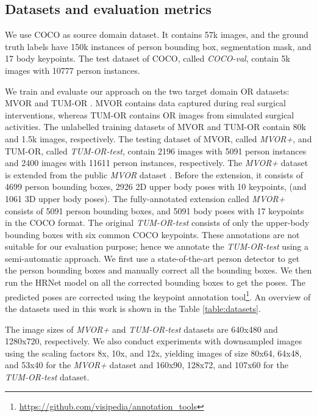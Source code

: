 \subsection{Datasets and evaluation metrics}
We use COCO \citep{lin2014microsoft} as source domain dataset. It contains 57k images, and the ground truth labels have 150k instances of person bounding box, segmentation mask, and 17 body keypoints. The test dataset of COCO, called \emph{COCO-val}, contain 5k images with 10777 person instances.

We train and evaluate our approach on the two target domain OR datasets: MVOR \citep{srivastav2018mvor,srivastav2020human} and TUM-OR \citep{belagiannis2016parsing}. MVOR contains data captured during real surgical interventions, whereas TUM-OR contains OR images from simulated surgical activities. The unlabelled training datasets of MVOR and TUM-OR contain 80k and 1.5k images, respectively. The testing dataset of MVOR, called \emph{MVOR+}, and TUM-OR, called \emph{TUM-OR-test}, contain 2196 images with 5091 person instances and 2400 images with 11611 person instances, respectively. The \emph{MVOR+} dataset is extended from the public \emph{MVOR} dataset \citep{srivastav2018mvor,srivastav2020human}. Before the extension, it consists of 4699 person bounding boxes, 2926 2D upper body poses with 10 keypoints, (and 1061 3D upper body poses). The fully-annotated extension called \emph{MVOR+} consists of 5091 person bounding boxes, and 5091 body poses with 17 keypoints in the COCO format. The original \emph{TUM-OR-test} consists of only the upper-body bounding boxes with six common COCO keypoints. These annotations are not suitable for our evaluation purpose; hence we annotate the \emph{TUM-OR-test} using a semi-automatic approach. We first use a state-of-the-art person detector \citep{cai2019cascade} to get the person bounding boxes and manually correct all the bounding boxes. We then run the HRNet model \citep{SunXLW19} on all the corrected bounding boxes to get the poses. The predicted poses are corrected using the keypoint annotation tool\footnote{\url{https://github.com/visipedia/annotation_tools}}. 
{\blue An overview of the datasets used in this work is shown in the Table \ref{table:datasets}}.

The image sizes of \emph{MVOR+} and \emph{TUM-OR-test} datasets are 640x480 and 1280x720, respectively. We also conduct experiments with downsampled images using the scaling factors 8x, 10x, and 12x, yielding images of size 80x64, 64x48, and 53x40 for the \emph{MVOR+} dataset and 160x90, 128x72, and 107x60 for the \emph{TUM-OR-test} dataset.

